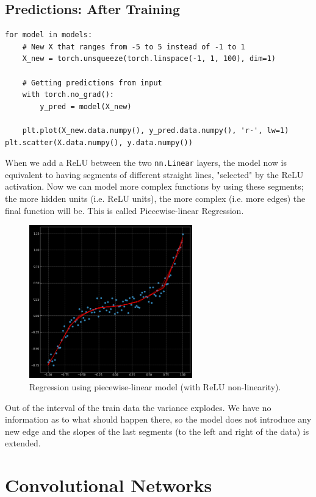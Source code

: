         \section{Predictions: After Training}
        \begin{verbatim}
for model in models:
    # New X that ranges from -5 to 5 instead of -1 to 1
    X_new = torch.unsqueeze(torch.linspace(-1, 1, 100), dim=1)

    # Getting predictions from input
    with torch.no_grad():
        y_pred = model(X_new)
        
    plt.plot(X_new.data.numpy(), y_pred.data.numpy(), 'r-', lw=1)
plt.scatter(X.data.numpy(), y.data.numpy())
        \end{verbatim}
        When we add a ReLU between the two \texttt{nn.Linear} layers, the model now is equivalent to having segments of different straight lines, "selected" by the ReLU activation. 
        Now we can model more complex functions by using these segments; the more hidden units (i.e. ReLU units), the more complex (i.e. more edges) the final function will be. This is called Piecewise-linear Regression.
        \begin{figure}[H]
        \begin{center}
        \includegraphics[width=200pt]{figs/05-piecewise_reg.png}
        \end{center} 
        \caption{Regression using piecewise-linear model (with ReLU non-linearity).}
        \end{figure}
        Out of the interval of the train data the variance explodes. 
        We have no information as to what should happen there, so the model does not introduce any new edge and the slopes of the last segments (to the left and right of the data) is extended.
        
\chapter{Convolutional Networks}
    
